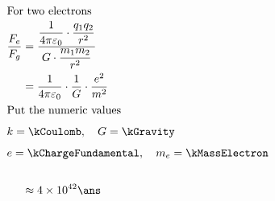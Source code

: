 \documentclass{article}
\begin{document}
\vtitle[ELECTROSTATICS]

\def\pn{02}
\def\book{Irodov}
\def\page{105}
\def\gdrive{
https://drive.google.com/drive/folders/1g0qyA9UnZSR0Ta2VQsGYTPoOP21cLkU5?usp=share_link}

\def\question{
Calculate the ratio of the electrostatic to gravitational interaction forces between two electrons, between two protons. At what value of the specific charge $q/m$ of a particle would these forces become equal (in their absolute values) in the case of interaction of identical particles?
}

\vspace*{\fill}
\vspace*{\fill}

\begin{center}
\end{center}
\vspace*{\fill}

\pagebreak


\addtolength{\jot}{2ex}
\begin{align*}
\intertext{For two electrons}
\dfrac{F_e}{F_g} &= \dfrac{\dfrac{1}{4\pi\varepsilon_0} \cdot \dfrac{q_1q_2}{r^2}}{G \cdot \dfrac{m_1m_2}{r^2}}\\
	&= \dfrac{1}{4\pi\varepsilon_0} \cdot \dfrac{1}{G} \cdot \dfrac{e^2}{m^2}\\
\intertext{Put the numeric values }
\intertext{$k=\kCoulomb, \quad G=\kGravity$}
\intertext{$e=\kChargeFundamental, \quad m_e=\kMassElectron $}	\\
	&\approx 4\times 10^{42} \ans  \\
\end{align*}
\end{document}
